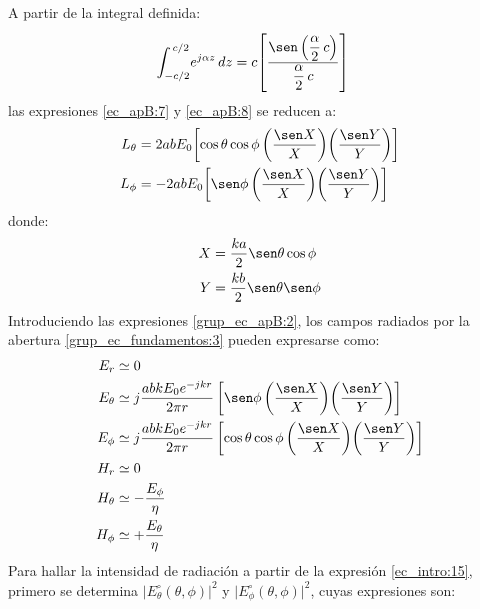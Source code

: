 A partir de la integral definida:
\begin{align}
\int_{-c/2}^{\,c/2}\!e^{j\alpha z}\,dz &= c\!\left[\rule{0pt}{25pt}\dfrac{\sen\left(\dfrac{\alpha}{2}\, c\right)}{\dfrac{\alpha}{2}\, c}\right]
\label{ec_apB:9}
\end{align}
las expresiones \eqref{ec_apB:7} y \eqref{ec_apB:8} se reducen a:
\begin{subequations}
\label{grup_ec_apB:2}
\begin{align}
L_{\theta} &= 2abE_0\!\left[\cos\theta\cos\phi\left(\frac{\sen X}{X}\right)\!\left(\frac{\sen Y}{Y}\right)\right]
\label{ec_apB:10}\\
L_{\phi} &= - 2abE_0\!\left[\sen\phi\left(\frac{\sen X}{X}\right)\!\left(\frac{\sen Y}{Y}\right)\right]
\label{ec_apB:11}
\end{align}
\end{subequations}
donde:
\begin{subequations}
\label{grup_ec_apB:3}
\begin{align}
X &= \frac{ka}{2}\sen\theta\cos\phi
\label{ec_apB:12}\\
Y &= \frac{kb}{2}\sen\theta\sen\phi
\label{ec_apB:13}
\end{align}
\end{subequations}
Introduciendo las expresiones \eqref{grup_ec_apB:2}, los campos radiados por la abertura \eqref{grup_ec_fundamentos:3} pueden expresarse como:
\begin{subequations}
\label{grup_ec_apB:4}
\begin{align}
E_r &\simeq 0
\label{ec_apB:14}\\
E_\theta &\simeq j\frac{abkE_0e^{-jkr}}{2\pi r}\left[\sen\phi\left(\frac{\sen X}{X}\right)\!\left(\frac{\sen Y}{Y}\right)\right]
\label{ec_apB:15}\\
E_\phi &\simeq j\frac{abkE_0e^{-jkr}}{2\pi r}\left[\cos\theta\cos\phi\left(\frac{\sen X}{X}\right)\!\left(\frac{\sen Y}{Y}\right)\right]
\label{ec_apB:16}\\
H_r &\simeq 0
\label{ec_apB:17}\\
H_\theta &\simeq -\frac{E_\phi}{\eta}
\label{ec_apB:18}\\
H_\phi &\simeq +\frac{E_\theta}{\eta}
\label{ec_apB:19}
\end{align}
\end{subequations}
Para hallar la intensidad de radiación a partir de la expresión \eqref{ec_intro:15}, primero se determina $\lvert E_{\theta}^{\circ}\left(\theta,\phi\right)\rvert^2$ y $\lvert E_{\phi}^{\circ}\left(\theta,\phi\right)\rvert^2$, cuyas expresiones son:
